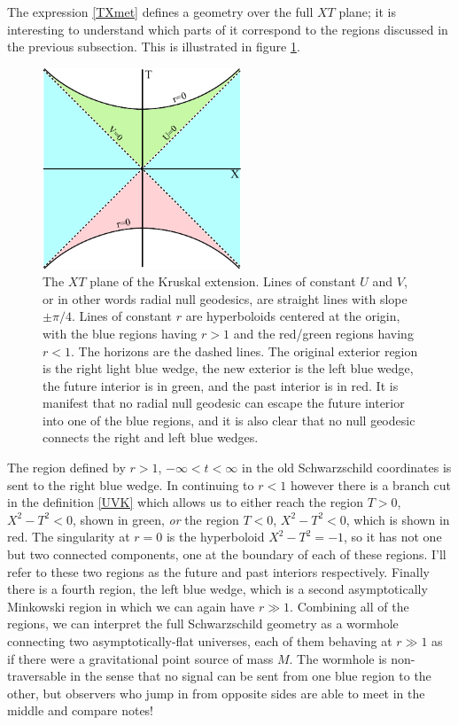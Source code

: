\documentclass[12pt]{article}
\begin{document}
The expression \eqref{TXmet} defines a geometry over the full $XT$ plane; it is interesting to understand which parts of it correspond to the regions discussed in the previous subsection.  This is illustrated in figure \ref{kruskfig}.
\begin{figure}
\begin{center}
\includegraphics[height=6cm]{kruskal.pdf}
\caption{The $XT$ plane of the Kruskal extension.  Lines of constant $U$ and $V$, or in other words radial null geodesics, are straight lines with slope $\pm \pi/4$.  Lines of constant $r$ are hyperboloids centered at the origin, with the blue regions having $r>1$ and the red/green regions having $r<1$.  The horizons are the dashed lines.  The original exterior region is the right light blue wedge, the new exterior is the left blue wedge, the future interior is in green, and the past interior is in red.  It is manifest that no radial null geodesic can escape the future interior into one of the blue regions, and it is also clear that no null geodesic connects the right and left blue wedges.}\label{kruskfig}
\end{center}
\end{figure}
The region defined by $r>1$, $-\infty<t<\infty$ in the old Schwarzschild coordinates is sent to the right blue wedge.  In continuing to $r<1$ however there is a branch cut in the definition \eqref{UVK} which allows us to either reach the region $T>0$, $X^2-T^2<0$, shown in green, \textit{or} the region $T<0$, $X^2-T^2<0$, which is shown in red.  The singularity at $r=0$ is the hyperboloid $X^2-T^2=-1$, so it has not one but two connected components, one at the boundary of each of these regions.  I'll refer to these two regions as the future and past interiors respectively.  Finally there is a fourth region, the left blue wedge, which is a second asymptotically Minkowski region in which we can again have $r\gg 1$.  Combining all of the regions, we can interpret the full Schwarzschild geometry as a wormhole connecting two asymptotically-flat universes, each of them behaving at $r\gg 1$ as if there were a gravitational point source of mass $M$.  The wormhole is non-traversable in the sense that no signal can be sent from one blue region to the other, but observers who jump in from opposite sides are able to meet in the middle and compare notes!
\end{document}
